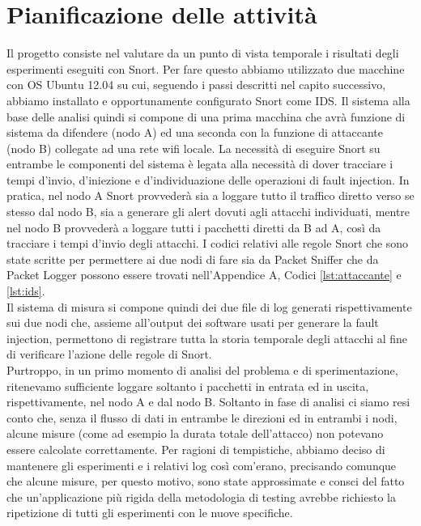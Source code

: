 \chapter{Pianificazione delle attività}

Il progetto consiste nel valutare da un punto di vista temporale i risultati degli esperimenti eseguiti con Snort. Per fare questo abbiamo utilizzato due macchine con OS Ubuntu 12.04 su cui, seguendo i passi descritti nel capito successivo, abbiamo installato e opportunamente configurato Snort come IDS. Il sistema alla base delle analisi quindi si compone di una prima macchina che avrà funzione di sistema da difendere (nodo A) ed una seconda con la funzione di attaccante (nodo B) collegate ad una rete wifi locale.
La necessità di eseguire Snort su entrambe le componenti del sistema è legata alla necessità di dover tracciare i tempi d'invio, d'iniezione e d'individuazione delle operazioni di fault injection. In pratica, nel nodo A Snort provvederà sia a loggare tutto il traffico diretto verso se stesso dal nodo B, sia a generare gli alert dovuti agli attacchi individuati, mentre nel nodo B provvederà a loggare tutti i pacchetti diretti da B ad A, così da tracciare i tempi d'invio degli attacchi. I codici relativi alle regole Snort che sono state scritte per permettere ai due nodi di fare sia da Packet Sniffer che da Packet Logger possono essere trovati nell'Appendice A, Codici \ref{lst:attaccante} e \ref{lst:ids}.\\
Il sistema di misura si compone quindi dei due file di log generati rispettivamente sui due nodi che, assieme all'output dei software usati per generare la fault injection, permettono di registrare tutta la storia temporale degli attacchi al fine di verificare l'azione delle regole di Snort.\\
Purtroppo, in un primo momento di analisi del problema e di sperimentazione, ritenevamo sufficiente loggare soltanto i pacchetti in entrata ed in uscita, rispettivamente, nel nodo A e dal nodo B. Soltanto in fase di analisi ci siamo resi conto che, senza il flusso di dati in entrambe le direzioni ed in entrambi i nodi, alcune misure (come ad esempio la durata totale dell'attacco) non potevano essere calcolate correttamente. Per ragioni di tempistiche, abbiamo deciso di mantenere gli esperimenti e i relativi log così com'erano, precisando comunque che alcune misure, per questo motivo, sono state approssimate e consci del fatto che un'applicazione più rigida della metodologia di testing avrebbe richiesto la ripetizione di tutti gli esperimenti con le nuove specifiche.


